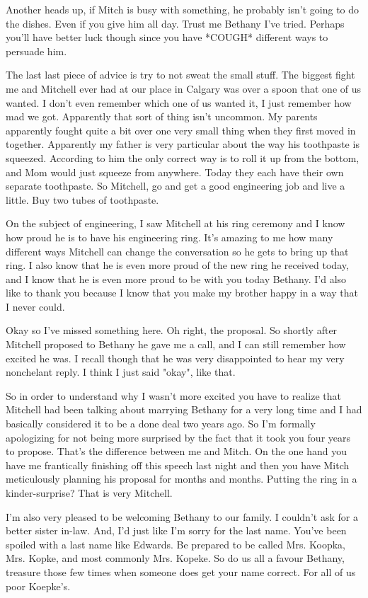 Another heads up, if Mitch is busy with something, he probably isn't going to do the dishes. Even if you give him all day. Trust me Bethany I've tried. Perhaps you'll have better luck though since you have *COUGH* different ways to persuade him.

The last last piece of advice is try to not sweat the small stuff. The biggest fight me and Mitchell ever had at our place in Calgary was over a spoon that one of us wanted. I don't even remember which one of us wanted it, I just remember how mad we got. Apparently that sort of thing isn't uncommon. My parents apparently fought quite a bit over one very small thing when they first moved in together. Apparently my father is very particular about the way his toothpaste is squeezed. According to him the only correct way is to roll it up from the bottom, and Mom would just squeeze from anywhere. Today they each have their own separate toothpaste. So Mitchell, go and get a good engineering job and live a little. Buy two tubes of toothpaste.

On the subject of engineering, I saw Mitchell at his ring ceremony and I know how proud he is to have his engineering ring. It's amazing to me how many different ways Mitchell can change the conversation so he gets to bring up that ring. I also know that he is even more proud of the new ring he received today, and I know that he is even more proud to be with you today Bethany. I'd also like to thank you because I know that you make my brother happy in a way that I never could.

Okay so I've missed something here. Oh right, the proposal. So shortly after Mitchell proposed to Bethany he gave me a call, and I can still remember how excited he was. I recall though that he was very disappointed to hear my very nonchelant reply. I think I just said "okay", like that.

So in order to understand why I wasn't more excited you have to realize that Mitchell had been talking about marrying Bethany for a very long time and I had basically considered it to be a done deal two years ago. So I'm formally apologizing for not being more surprised by the fact that it took you four years to propose. That's the difference between me and Mitch. On the one hand you have me frantically finishing off this speech last night and then you have Mitch meticulously planning his proposal for months and months. Putting the ring in a kinder-surprise? That is very Mitchell.

I'm also very pleased to be welcoming Bethany to our family. I couldn't ask for a better sister in-law. And, I'd just like I'm sorry for the last name. You've been spoiled with a last name like Edwards. Be prepared to be called Mrs. Koopka, Mrs. Kopke, and most commonly Mrs. Kopeke. So do us all a favour Bethany, treasure those few times when someone does get your name correct. For all of us poor Koepke's.

